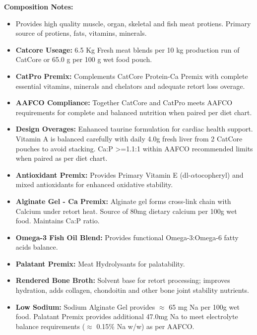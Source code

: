 \noindent\textbf{Composition Notes:}
\begin{itemize}
\item{}Provides high quality muscle, organ, skeletal and fish meat protiens. Primary source of protiens, fats, vitamins, minerals. 
\item \textbf{Catcore Useage: }6.5 Kg Fresh meat blends per 10 kg production run of CatCore or 65.0 g per 100 g wet food pouch.
\item \textbf{CatPro Premix: } Complements CatCore Protein-Ca Premix with complete essential vitamins, minerals and chelators and adequate retort loss overage. 
\item\textbf{AAFCO Compliance: } Together CatCore and CatPro meets AAFCO requirements for complete and balanced nutrition when paired per diet chart. 
\item\textbf{Design Overages: }Enhanced taurine formulation for cardiac health support. Vitamin A is balanced carefully with daily 4.0g fresh liver from 2 CatCore pouches to avoid stacking. Ca:P >=1.1:1 within AAFCO recommended limits when paired as per diet chart. 
\item \textbf{Antioxidant Premix: } Provides Primary Vitamin E (dl-$\alpha$tocopheryl) and mixed antioxidants for enhanced oxidative stability.
\item \textbf{Alginate Gel - Ca Premix:} Alginate gel forms cross-link chain with Calcium under retort heat. Source of 80mg dietary calcium per 100g wet food. Maintains Ca:P ratio. 
\item \textbf{Omega-3 Fish Oil Blend:} Provides functional Omega-3:Omega-6 fatty acids balance. 
\item \textbf{Palatant Premix: } Meat Hydrolysants for palatability.
\item \textbf{Rendered Bone Broth: } Solvent base for retort processing; improves hydration, adds collagen, chondoitin and other bone joint stability nutrients. 
\item\textbf {Low Sodium:} Sodium Alginate Gel provides $\approx$ 65 mg Na per 100g wet food. Palatant Premix provides additional 47.0mg Na to meet electrolyte balance requirements ($\approx$ 0.15\% Na w/w) as per AAFCO. 
\end{itemize}

